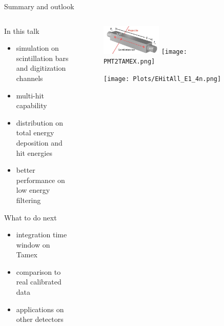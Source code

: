 \documentclass[compress, 13pt, aspectratio=169]{beamer}
\begin{document}
\begin{frame}{Summary and outlook}
    \begin{columns}
        \begin{column}{0.5\textwidth}
            \begin{block}{In this talk}
                \begin{itemize}
                    \item simulation on scintillation bars and digitization channels
                    \item multi-hit capability
                    \item distribution on total energy deposition and hit energies
                    \item better performance on low energy filtering
                \end{itemize}
            \end{block}

            \begin{exampleblock}{What to do next}
                \begin{itemize}
                    \item integration time window on Tamex
                    \item comparison to real calibrated data
                    \item applications on other detectors
                \end{itemize}
            \end{exampleblock}
        \end{column}
        \begin{column}{0.5\textwidth}
            \begin{figure}[t]
                \includegraphics[keepaspectratio, width = 0.4\textwidth]{Bar}%
                \texttt{[image: PMT2TAMEX.png]}%
            \end{figure}
            \begin{figure}[t]
                \texttt{[image: Plots/EHitAll\_E1\_4n.png]}%
            \end{figure}
        \end{column}
    \end{columns}
\end{frame}
    
\end{document}
